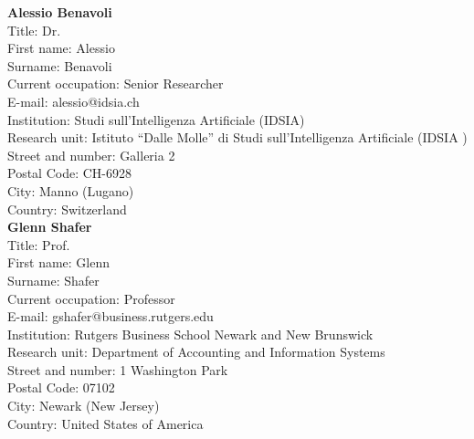 \documentclass[11pt,dvipsnames,usenames,a4paper]{article}
\begin{document}
{\bf Alessio Benavoli}\\
Title: Dr.\\
First name: Alessio\\
Surname:  Benavoli\\
Current occupation: Senior Researcher \\
E-mail: alessio@idsia.ch\\
Institution: Studi sull'Intelligenza Artificiale (IDSIA)\\
Research unit: Istituto ``Dalle Molle'' di 
Studi sull'Intelligenza Artificiale (IDSIA )\\
Street and number: Galleria 2\\
Postal Code: CH-6928\\
City: Manno (Lugano)\\
Country: Switzerland\\[-7pt]



{\bf Glenn Shafer}\\
Title: Prof.\\
First name: Glenn\\
Surname:  Shafer \\
Current occupation: Professor\\
E-mail: gshafer@business.rutgers.edu
\\
Institution: Rutgers Business School Newark and New Brunswick\\
Research unit: Department of Accounting and Information Systems\\
Street and number: 1 Washington Park\\
Postal Code: 07102\\
City: Newark (New Jersey)\\
Country: United States of America\\[-7pt]
\end{document}
